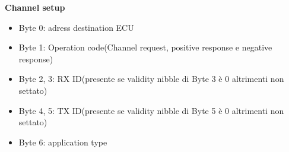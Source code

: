 \textbf{Channel setup}
\begin{itemize}
  \item Byte 0: adress destination ECU
  \item Byte 1: Operation code(Channel request, positive response e negative response)
  \item Byte 2, 3: RX ID(presente se validity nibble di Byte 3 è 0 altrimenti non settato)
  \item Byte 4, 5: TX ID(presente se validity nibble di Byte 5 è 0 altrimenti non settato)
  \item Byte 6: application type
\end{itemize}

